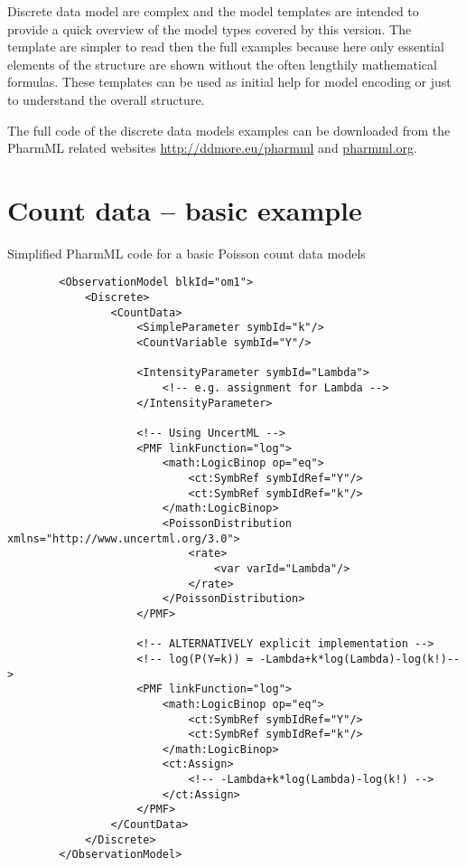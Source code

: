 Discrete data model are complex and the model templates are intended 
to provide a quick overview of the model types covered by this 
\pharmml version. The template are simpler to read then the full examples because 
here only essential elements of the structure are shown without the often lengthily 
mathematical formulas. These templates can be used as initial help for model encoding
or just to understand the overall structure. 

The full code of the discrete data models examples can be downloaded from the PharmML
related websites \url{http://ddmore.eu/pharmml} and \url{pharmml.org}.

\section{Count data -- basic example}
Simplified PharmML code for a basic Poisson count data models
\lstset{language=XML}
\begin{lstlisting}
        <ObservationModel blkId="om1">
            <Discrete>
                <CountData>
                    <SimpleParameter symbId="k"/>
                    <CountVariable symbId="Y"/>

                    <IntensityParameter symbId="Lambda">
                        <!-- e.g. assignment for Lambda -->
                    </IntensityParameter>
                    
                    <!-- Using UncertML -->
                    <PMF linkFunction="log">
                        <math:LogicBinop op="eq">
                            <ct:SymbRef symbIdRef="Y"/>
                            <ct:SymbRef symbIdRef="k"/>
                        </math:LogicBinop>
                        <PoissonDistribution xmlns="http://www.uncertml.org/3.0">
                            <rate>
                                <var varId="Lambda"/>
                            </rate>
                        </PoissonDistribution>
                    </PMF>
                    
                    <!-- ALTERNATIVELY explicit implementation -->
                    <!-- log(P(Y=k)) = -Lambda+k*log(Lambda)-log(k!)-->
                    <PMF linkFunction="log">
                        <math:LogicBinop op="eq">
                            <ct:SymbRef symbIdRef="Y"/>
                            <ct:SymbRef symbIdRef="k"/>
                        </math:LogicBinop>
                        <ct:Assign>
                            <!-- -Lambda+k*log(Lambda)-log(k!) -->
                        </ct:Assign>
                    </PMF>
                </CountData>
            </Discrete>
        </ObservationModel>
\end{lstlisting}


